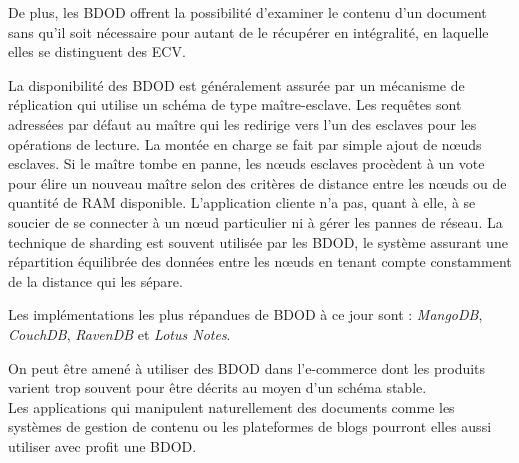 \documentclass[12pt]{article}
\begin{document}
De plus, les BDOD offrent la possibilité d'examiner le contenu d'un document sans qu'il soit nécessaire pour autant de le récupérer en intégralité, en laquelle elles se distinguent des ECV. \par
La disponibilité des BDOD est généralement assurée par un mécanisme de réplication qui utilise un schéma de type maître-esclave. Les requêtes sont adressées par défaut au maître qui les redirige vers l'un des esclaves pour les opérations de lecture. La montée en charge se fait par simple ajout de nœuds esclaves. Si le maître tombe en panne, les nœuds esclaves procèdent à un vote pour élire un nouveau maître selon des critères de distance entre les nœuds ou de quantité de RAM disponible. L'application cliente n'a pas, quant à elle, à se soucier de se connecter à un nœud particulier ni à gérer les pannes de réseau. La technique de sharding est souvent utilisée par les BDOD, le système assurant une répartition équilibrée des données entre les nœuds en tenant compte constamment de la distance qui les sépare.\par
Les implémentations les plus répandues de BDOD à ce jour sont : \emph{MangoDB}, \emph{CouchDB}, \emph{RavenDB} et \emph{Lotus Notes}. \par
On peut être amené à utiliser des BDOD dans l'e-commerce dont les produits varient trop souvent pour être décrits au moyen d'un schéma stable.\\
Les applications qui manipulent naturellement des documents comme les systèmes de gestion de contenu ou les plateformes de blogs pourront elles aussi utiliser avec profit une BDOD.
\end{document}
